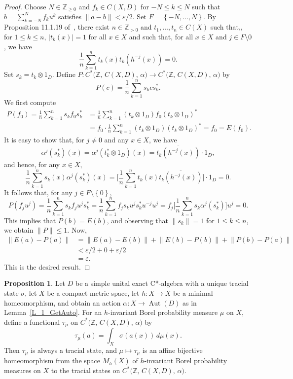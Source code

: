 \documentclass[10pt]{amsart}
\numberwithin{equation}{section}
\theoremstyle{definition}
\newtheorem{prp}[thm]{Proposition}
\newcommand{\af}{\alpha}
\newcommand{\ep}{\varepsilon}
\newcommand{\sm}{\sigma}
\newcommand{\Z}{{\mathbb{Z}}}
\newcommand{\N}{{\mathbb{Z}}_{> 0}}
\newcommand{\Nz}{{\mathbb{Z}}_{\geq 0}}
\newcommand{\Aut}{{\operatorname{Aut}}}
\newcommand{\set}[1]{\left\{ #1 \right\}}
\begin{document}
\begin{proof}
%
Choose $N \in \Nz$ and $f_k \in C (X,D)$ for
$-N \leq k \leq N$ such that
$b = \sum_{k = -N}^{N} f_k u^k$ satisfies
$\lVert a - b \rVert < \ep/2$.
Set
$F = \set{-N, \ldots,N}$.
By Proposition 11.1.19
of~\cite{GKPT}, there exist $n \in \N$ and
$t_1 , \ldots , t_n \in C (X)$ such that,,
for $1 \leq k \leq n$,
$\vert t_k (x) \vert = 1$ for all $x \in X$
and such that, for all
$x \in X$ and $j \in F \setminus {0}$, we have
%
\[
\frac{1}{n} \sum_{k=1}^{n} t_k (x)
\overline{ t_k (h^{-j}(x)) } = 0.
\]
%
Set $s_k = t_k \otimes 1_D$.
Define
$P \colon C^* \bigl( \Z, \, C (X, D), \, \af \bigr)
\to C^* \bigl( \Z, \, C (X, D), \, \af \bigr)$ by
%
\[
P(c) = \frac{1}{n} \sum_{k=1}^{n} s_k c s_k^*.
\]
%
We first compute
%
\begin{align*}
P(f_0) = \frac{1}{n} \sum_{k=1}^{n} s_k f_0 s_k^*
&= \frac{1}{n} \sum_{k=1}^{n} (t_k \otimes 1_D)
f_0 (t_k \otimes 1_D)^* \\ &= f_0 \cdot \frac{1}{n}
\sum_{k=1}^{n} (t_k \otimes 1_D) (t_k \otimes 1_D)^*
= f_0 = E(f_0).
\end{align*}
%
It is easy to show that, for $j \neq 0$ and any
$x \in X$, we have
%
\[
\af^j (s_k^*) (x) = \af^j (t_k^* \otimes 1_D) (x)
= \overline{ t_k (h^{-j}(x)) } \cdot 1_D,
\]
%
and hence, for any $x \in X$,
\[
\frac{1}{n} \sum_{k=1}^{n} s_k (x) \af^j (s_k^*) (x)
= \Big[ \frac{1}{n} \sum_{k=1}^{n} t_k (x)
\overline{ t_k (h^{-j}(x)) } \Big] \cdot 1_D = 0.
\]
%
It follows that, for any $j \in F \setminus \set{0}$,
%
\[
P(f_j u^j) =
\frac{1}{n} \sum_{k=1}^{n} s_k f_j u^j s_k^*
= \frac{1}{n} \sum_{k=1}^{n} f_j s_k u^j s_k^*
u^{-j} u^j = f_j \Big[
\frac{1}{n} \sum_{k=1}^{n} s_k \af^j (s_k^*) \Big] u^j
= 0.
\]
%
This implies that $P(b) = E(b)$, and observing that
$\lVert s_k \rVert = 1$ for $1 \leq k \leq n$, we
obtain $\lVert P \rVert \leq 1$.
Now,
%
\begin{align*}
\lVert E(a) - P(a) \rVert &= \lVert E(a) - E(b) \rVert
+ \lVert E(b) - P(b) \rVert + \lVert P(b) - P(a) \rVert \\
&< \ep/2 + 0 + \ep/2 \\
&= \ep.
\end{align*}
%
This is the desired result.
%
\end{proof}

\begin{prp}\label{P_1_TracialStates}
Let $D$ be a simple unital exact C*-algebra with
a unique tracial state $\sm$, let $X$ be a compact
metric space, let $h \colon X \to X$ be a minimal
homeomorphism, and obtain an action
$\af \colon X \to \Aut (D)$ as in
Lemma~\ref{L_1_GetAuto}.
For an $h$-invariant Borel probability
measure $\mu$ on $X$, define a functional $\tau_{\mu}$
on $C^* \bigl( \Z, \, C (X, D), \, \af \bigr)$ by
%
\[
\tau_{\mu}(a) = \int_{X} \sm (a (x)) \, d \mu (x).
\]
%
Then $\tau_{\mu}$ is always a tracial state, and
$\mu \mapsto \tau_{\mu}$ is an affine bijective
homeomorphism from the space $M_{h}(X)$ of $h$-invariant
Borel probability measures on $X$ to the tracial states
on $C^* \bigl( \Z, \, C (X, D), \, \af \bigr)$.
\end{prp}
\end{document}
